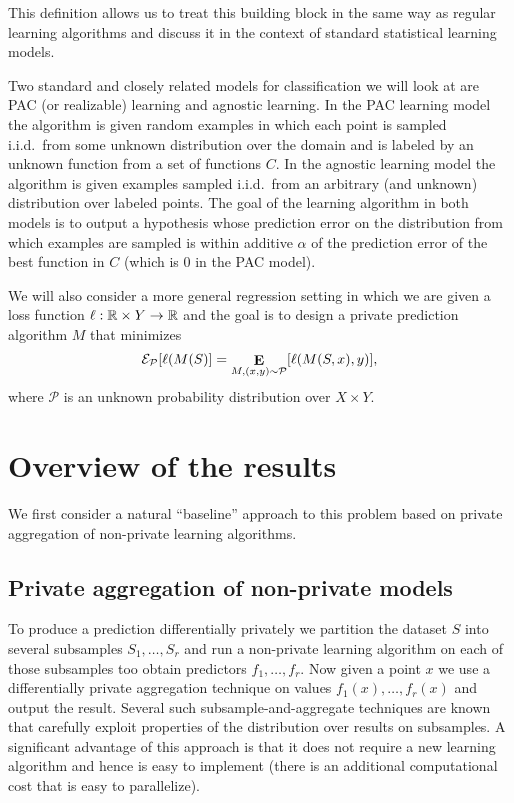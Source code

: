 \documentclass[final,12pt]{colt2018}
\providecommand{\cE}{{\mathcal E}}
\providecommand{\cP}{{\mathcal P}}
\begin{document}
This definition allows us to treat this building block in the same way as regular learning algorithms and discuss it in the context of standard statistical learning models.

Two standard and closely related models for classification we will look at are PAC (or realizable) learning  \citep{Valiant:84} and agnostic \citep{Haussler:92,KearnsSS:94} learning.  In the PAC learning model the algorithm is given random examples in which each point is sampled i.i.d.~from some unknown distribution over the domain and is labeled by an unknown function from a set of functions $C$. In the agnostic learning model the algorithm is given examples sampled i.i.d.~from an arbitrary (and unknown) distribution over labeled points. The goal of the learning algorithm in both models is to output a hypothesis whose prediction error on the distribution from which examples are sampled is within additive $\alpha$ of the prediction error of the best function in $C$ (which is $0$ in the PAC model).

We will also consider a more general regression setting in which we are given a loss function $\ell: {\mathbb R}\times Y \rightarrow {\mathbb R}$ and the goal is to design a private prediction algorithm $M$ that minimizes  $$\cE_{\cP}[\ell(M(S)] = \E_{M, (x,y) \sim \cP}[\ell(M(S,x),y)] ,$$
where $\cP$ is an unknown probability distribution  over $X\times Y$.


\section{Overview of the results}
We first consider a natural ``baseline'' approach to this problem based on private aggregation of non-private learning algorithms.

\subsection{Private aggregation of non-private models}
To produce a prediction differentially privately we partition the dataset $S$ into several subsamples $S_1,\ldots,S_r$ and run a non-private learning algorithm on each of those subsamples too obtain predictors $f_1,\ldots,f_r$. Now given a point $x$ we use a differentially private aggregation technique on values $f_1(x),\ldots,f_r(x)$ and output the result. Several such subsample-and-aggregate techniques are known \citep{NissimRS07,DworkLei:09,SmithT13,DworkRoth:14} that carefully exploit properties of the distribution over results on subsamples. A significant advantage of this approach is that it does not require a new learning algorithm and hence is easy to implement (there is an additional computational cost that is easy to parallelize).
\end{document}
